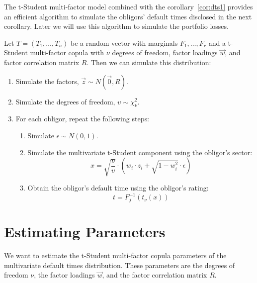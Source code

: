 \documentclass[11pt,fleqn]{book} %
\begin{document}
The t-Student multi-factor model combined with the corollary~\ref{cor:dts1} 
provides an efficient algorithm to simulate the obligors' default times 
disclosed in the next corollary. Later we will use this algorithm to simulate
the portfolio losses.

\begin{corollary}
	\label{cor:dts2}
	Let $T=(T_1, \dots, T_n)$ be a random vector with marginals 
	$F_1, \dots, F_r$ and a t-Student multi-factor copula with 
	$\nu$ degrees of freedom, factor loadings $\vec{w}$, and factor correlation 
	matrix $R$. Then we can simulate this distribution:
	\begin{enumerate}
		\item Simulate the factors, $\vec{z} \sim N(\vec{0},R)$.
		\item Simulate the degrees of freedom, $\upsilon \sim \chi_{\nu}^2$.
		\item For each obligor, repeat the following steps:
		\begin{enumerate}
			\item Simulate $\epsilon \sim N(0,1)$.
			\item Simulate the multivariate t-Student component using the obligor's sector:
			\begin{displaymath}
				x = \sqrt{\frac{\nu}{\upsilon}} \cdot \left( w_i \cdot z_i + \sqrt{1-w_i^2} \cdot \epsilon \right)
			\end{displaymath}
			\item Obtain the obligor's default time using the obligor's rating:
			\begin{displaymath}
				t = F_j^{-1}\left(t_{\nu}(x)\right)
			\end{displaymath}
		\end{enumerate}
	\end{enumerate}
\end{corollary}


\chapter{Estimating Parameters}
\label{chap:estimation}

We want to estimate the t-Student multi-factor copula parameters of the 
multivariate default times distribution. These parameters are the degrees of 
freedom $\nu$, the factor loadings $\vec{w}$, and the factor correlation 
matrix $R$.
\end{document}
